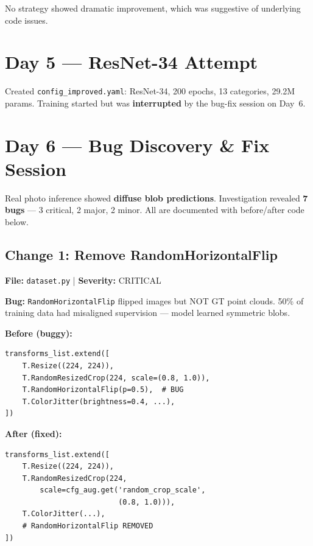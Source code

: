 \documentclass[10pt,twocolumn,letterpaper]{article}
\begin{document}
No strategy showed dramatic improvement, which was suggestive of underlying code issues.

\section{Day 5 --- ResNet-34 Attempt}

Created \texttt{config\_improved.yaml}: ResNet-34, 200 epochs, 13 categories, 29.2M params. Training started but was \textbf{interrupted} by the bug-fix session on Day~6.

\section{Day 6 --- Bug Discovery \& Fix Session}
\label{sec:bugs}

Real photo inference showed \textbf{diffuse blob predictions}. Investigation revealed \textbf{7 bugs} --- 3 critical, 2 major, 2 minor. All are documented with before/after code below.

\subsection{Change 1: Remove RandomHorizontalFlip}
\textbf{File:} \texttt{dataset.py} | \textbf{Severity:} \textcolor{bugred}{CRITICAL}

\textbf{Bug:} \texttt{RandomHorizontalFlip} flipped images but NOT GT point clouds. 50\% of training data had misaligned supervision --- model learned symmetric blobs.

\textbf{Before (buggy):}
\begin{lstlisting}
transforms_list.extend([
    T.Resize((224, 224)),
    T.RandomResizedCrop(224, scale=(0.8, 1.0)),
    T.RandomHorizontalFlip(p=0.5),  # BUG
    T.ColorJitter(brightness=0.4, ...),
])
\end{lstlisting}

\textbf{After (fixed):}
\begin{lstlisting}
transforms_list.extend([
    T.Resize((224, 224)),
    T.RandomResizedCrop(224,
        scale=cfg_aug.get('random_crop_scale',
                          (0.8, 1.0))),
    T.ColorJitter(...),
    # RandomHorizontalFlip REMOVED
])
\end{lstlisting}
\end{document}

